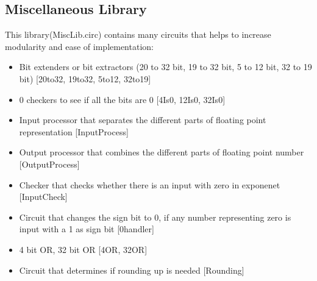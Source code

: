 \documentclass[12pt]{article}
\begin{document}
\subsection{Miscellaneous Library}
This library(MiscLib.circ) contains many circuits that helps to increase modularity and ease of implementation:
\begin{itemize}
    \item Bit extenders or bit extractors (20 to 32 bit, 19 to 32 bit, 5 to 12 bit, 32 to 19 bit) [20to32, 19to32, 5to12, 32to19]
    \item 0 checkers to see if all the bits are 0 [4Is0, 12Is0, 32Is0]
    \item Input processor that separates the different parts of floating point representation [InputProcess]
    \item Output processor that combines the different parts of floating point number [OutputProcess]
    \item Checker that checks whether there is an input with zero in exponenet [InputCheck]
    \item Circuit that changes the sign bit to 0, if any number representing zero is input with a 1 as sign bit [0handler]
    \item 4 bit OR, 32 bit OR [4OR, 32OR]
    \item Circuit that determines if rounding up is needed [Rounding]
\end{itemize}
\end{document}
